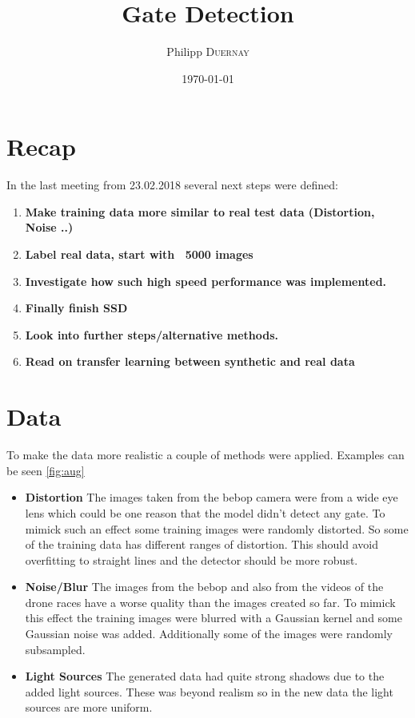 \documentclass{article}
\title{Gate Detection} %
\author{Philipp \textsc{Duernay}} %
\date{\today} %
\begin{document}
\maketitle


\section{Recap}
In the last meeting from 23.02.2018 several next steps were defined:
\begin{enumerate}
	\item \textbf{Make training data more similar to real test data (Distortion, Noise ..)}
	\item \textbf{Label real data, start with ~5000 images}
	\item \textbf{Investigate how such high speed performance was implemented.}
	\item \textbf{Finally finish SSD}
	\item \textbf{Look into further steps/alternative methods.}
	\item \textbf{Read on transfer learning between synthetic and real data}
\end{enumerate}

\section{Data}

To make the data more realistic a couple of methods were applied. Examples can be seen \autoref{fig:aug}

\begin{itemize}
	\item \textbf{Distortion} The images taken from the bebop camera were from a wide eye lens which could be one reason that the model didn't detect any gate. To mimick such an effect some training images were randomly distorted. So some of the training data has different ranges of distortion. This should avoid overfitting to straight lines and the detector should be more robust.
	\item \textbf{Noise/Blur} The images from the bebop and also from the videos of the drone races have a worse quality than the images created so far. To mimick this effect the training images were blurred with a Gaussian kernel and some Gaussian noise was added. Additionally some of the images were randomly subsampled.
	\item \textbf{Light Sources} The generated data had quite strong shadows due to the added light sources. These was beyond realism so in the new data the light sources are more uniform.
\end{itemize}
\end{document}
